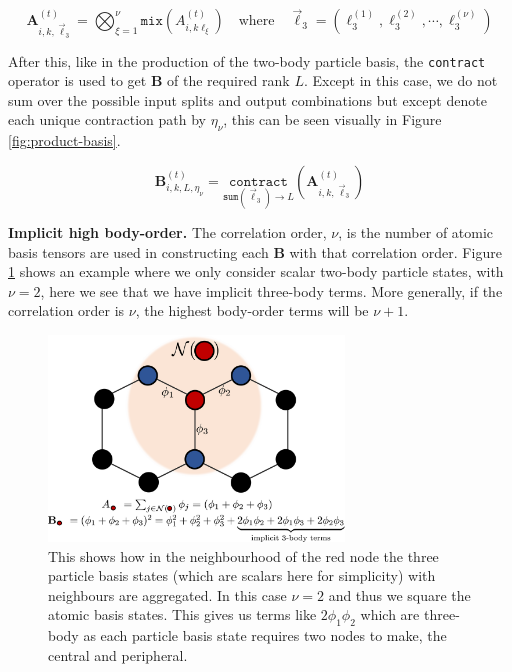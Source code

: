 \begin{equation} \label{eq:product}
    \mathbf{A}^{(t)}_{i,k,\vec \ell_3} =  \bigotimes_{\xi=1}^{\nu} \texttt{mix}(A^{(t)}_{i,k\ell_\xi}) \quad \text{where} \quad \vec\ell_3 = (\ell^{(1)}_3,\ell^{(2)}_3, \cdots, \ell^{(\nu)}_3)
\end{equation}

After this, like in the production of the two-body particle basis, the \texttt{contract} operator is used to get $\mathbf B$ of the required rank $L$. Except in this case, we do not sum over the possible input splits and output combinations but except denote each unique contraction path by $\eta_\nu$, this can be seen visually in Figure \ref{fig:product-basis}.

\begin{equation} \label{eq:prod-con}
    \mathbf{B}^{(t)}_{i,k,L,\eta_\nu} = \underset{\texttt{sum}(\vec\ell_3) \rightarrow L}{\texttt{contract}}(\mathbf{A}^{(t)}_{i,k,\vec\ell_3})
\end{equation}

\textbf{Implicit high body-order. } The correlation order, $\nu$, is the number of atomic basis tensors are used in constructing each $\mathbf B$ with that correlation order. Figure \ref{fig:implicit-high-body} shows an example where we only consider scalar two-body particle states, with $\nu=2$, here we see that we have implicit three-body terms. More generally, if the correlation order is $\nu$, the highest body-order terms will be $\nu+1$. 

\begin{figure}[H]
    \centering
    \includegraphics[width=0.7\textwidth]{figures/implicit-high-body.png}
    \caption{This shows how in the neighbourhood of the red node the three particle basis states (which are scalars here for simplicity) with neighbours are aggregated. In this case $\nu=2$ and thus we square the atomic basis states. This gives us terms like $2\phi_1\phi_2$ which are three-body as each particle basis state requires two nodes to make, the central and peripheral.}
    \label{fig:implicit-high-body}
\end{figure}

